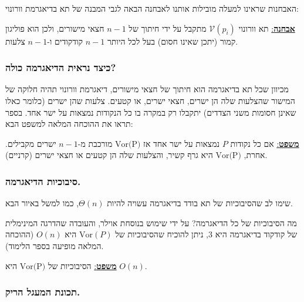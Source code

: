 \documentclass[
]{book}
\begin{document}
האבחנות שראינו למעלה מובילות אותנו לאבחנה הבאה לגבי המבנה של תא בדיאגרמת וורונוי:

\ul{\textbf{אבחנה}:} תא וורונוי \(\mathcal{V}(p_i)\) מתקבל על ידי חיתוך של \(n-1\) חצאי מישורים, ולכן הוא פוליגון קמור (יתכן שאינו חסום) בעל לכל היותר \(n-1\) קודקודים ו-\(n-1\) צלעות.

\hypertarget{ux5dbux5d9ux5e6ux5d3-ux5e0ux5e8ux5d0ux5d9ux5ea-ux5d4ux5d3ux5d9ux5d0ux5d2ux5e8ux5deux5d4-ux5dbux5d5ux5dcux5d4}{%
\subsubsection*{כיצד נראית הדיאגרמה כולה?}\label{ux5dbux5d9ux5e6ux5d3-ux5e0ux5e8ux5d0ux5d9ux5ea-ux5d4ux5d3ux5d9ux5d0ux5d2ux5e8ux5deux5d4-ux5dbux5d5ux5dcux5d4}}

מכיוון שכל תא בדיאגרמה הוא חיתוך של חצאי מישורים, דיאגרמת וורונוי תהיה חלוקה של המישור שהצלעות שלה הן ישרים, חצאי ישרים, או קטעים. צלעות שהן ישרים (כלומר כאלו שאינן חסומות משני הצדדים) יתקבלו רק במקרה בו כל הנקודות נמצאות על ישר אחד. בספר תראו את ההוכחה המלאה למשפט הבא:

\ul{\textbf{משפט}:} אם כל נקודות \(P\) נמצאות על ישר אחד אז \(\text{Vor(P)}\) מורכבת מ-\(n-1\) ישרים מקבילים. אחרת, \(\text{Vor(P)}\) היא גרף קשיר, והצלעות שלה הן קטעים או חצאי ישרים (קרניים).

\hypertarget{ux5e1ux5d9ux5d1ux5d5ux5dbux5d9ux5d5ux5ea-ux5d4ux5d3ux5d9ux5d0ux5d2ux5e8ux5deux5d4.}{%
\subsubsection*{סיבוכיות הדיאגרמה.}\label{ux5e1ux5d9ux5d1ux5d5ux5dbux5d9ux5d5ux5ea-ux5d4ux5d3ux5d9ux5d0ux5d2ux5e8ux5deux5d4.}}

שימו לב שהסיבוכיות של תא בודד בדיאגרמה עשויה להיות \(\Theta(n)\), כמו למשל באיור הבא.

מה הסיבוכיות של כל הדיאגרמה? על ידי שימוש בנוסחת אוילר, והעובדה שהדרגה המינימלית של קודקוד בדיאגרמה היא 3, ניתן להוכיח שהסיבוכיות של \(\text{Vor}(P)\) היא \(O(n)\) (ההוכחה המלאה מופיעה בספר הלימוד).

\ul{\textbf{משפט}:} הסיבוכיות של \(\text{Vor(P)}\) היא \(O(n)\).

\hypertarget{ux5eaux5dbux5d5ux5e0ux5ea-ux5d4ux5deux5e2ux5d2ux5dc-ux5d4ux5e8ux5d9ux5e7.}{%
\subsubsection*{תכונת המעגל הריק.}\label{ux5eaux5dbux5d5ux5e0ux5ea-ux5d4ux5deux5e2ux5d2ux5dc-ux5d4ux5e8ux5d9ux5e7.}}
\end{document}
